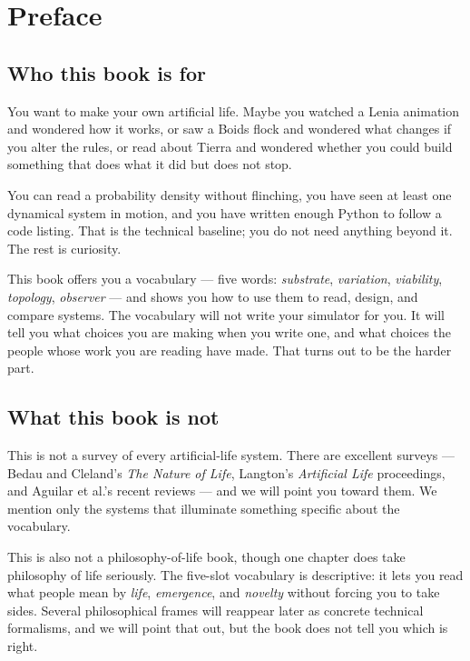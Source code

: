 \chapter{Preface}

\section*{Who this book is for}

You want to make your own artificial life. Maybe you watched a Lenia
animation and wondered how it works, or saw a Boids flock and wondered
what changes if you alter the rules, or read about Tierra and wondered
whether you could build something that does what it did but does not
stop.

You can read a probability density without flinching, you have seen at
least one dynamical system in motion, and you have written enough
Python to follow a code listing. That is the technical baseline; you
do not need anything beyond it. The rest is curiosity.

This book offers you a vocabulary --- five words: \emph{substrate},
\emph{variation}, \emph{viability}, \emph{topology}, \emph{observer}
--- and shows you how to use them to read, design, and compare systems.
The vocabulary will not write your simulator for you. It will tell you
what choices you are making when you write one, and what choices the
people whose work you are reading have made. That turns out to be the
harder part.

\section*{What this book is not}

This is not a survey of every artificial-life system. There are
excellent surveys --- Bedau and Cleland's \textit{The Nature of Life},
Langton's \textit{Artificial Life} proceedings, and Aguilar et al.'s
recent reviews --- and we will point you toward them. We mention only
the systems that illuminate something specific about the vocabulary.

This is also not a philosophy-of-life book, though one chapter does
take philosophy of life seriously. The five-slot vocabulary is
descriptive: it lets you read what people mean by \emph{life},
\emph{emergence}, and \emph{novelty} without forcing you to take sides.
Several philosophical frames will reappear later as concrete technical
formalisms, and we will point that out, but the book does not tell you
which is right.

